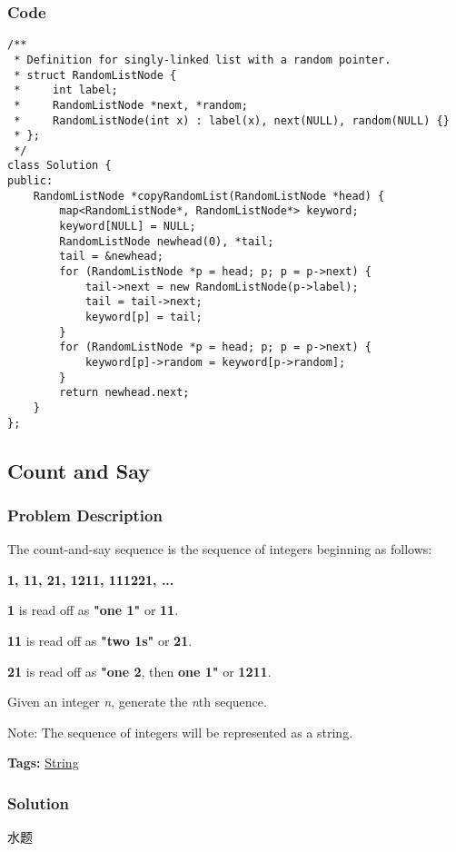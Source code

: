 \documentclass{article}
\begin{document}
\begin{CJK*}{UTF8}{gkai}
\subsubsection*{Code}
\begin{lstlisting}
/**
 * Definition for singly-linked list with a random pointer.
 * struct RandomListNode {
 *     int label;
 *     RandomListNode *next, *random;
 *     RandomListNode(int x) : label(x), next(NULL), random(NULL) {}
 * };
 */
class Solution {
public:
    RandomListNode *copyRandomList(RandomListNode *head) {
        map<RandomListNode*, RandomListNode*> keyword;
        keyword[NULL] = NULL;
        RandomListNode newhead(0), *tail;
        tail = &newhead;
        for (RandomListNode *p = head; p; p = p->next) {
            tail->next = new RandomListNode(p->label);
            tail = tail->next;
            keyword[p] = tail;
        }
        for (RandomListNode *p = head; p; p = p->next) {
            keyword[p]->random = keyword[p->random];
        }
        return newhead.next;
    }
}; 
\end{lstlisting}


\subsection{ Count and Say }
\label{ Count and Say }

\subsubsection*{Problem Description}
The count-and-say sequence is the sequence of integers beginning as follows:


\textbf{1, 11, 21, 1211, 111221, ...}

\textbf{1} is read off as \textbf{"one 1"} or \textbf{11}.


\textbf{11} is read off as \textbf{"two 1s"} or \textbf{21}.


\textbf{21} is read off as \textbf{"one 2}, then \textbf{one 1"} or \textbf{1211}.

Given an integer \emph{n}, generate the \emph{n}th sequence.

Note: The sequence of integers will be represented as a string.


\textbf{Tags: }
\hyperref[ String ]{ String }



\subsubsection*{Solution}
水题


\end{CJK*}
\end{document}
